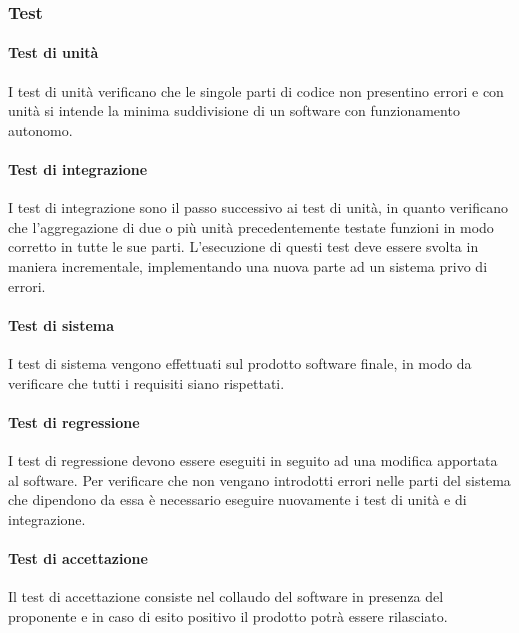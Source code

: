 \subsubsection{Test}
\paragraph{Test di unità} \Spazio
I test di unità verificano che le singole parti di codice non presentino errori e con unità si intende la minima suddivisione di un software con funzionamento autonomo.

\paragraph{Test di integrazione} \Spazio
I test di integrazione sono il passo successivo ai test di unità, in quanto verificano che l'aggregazione di due o più unità precedentemente testate funzioni in modo corretto in tutte le sue parti. L'esecuzione di questi test deve essere svolta in maniera incrementale, implementando una nuova parte ad un sistema privo di errori.

\paragraph{Test di sistema} \Spazio
I test di sistema vengono effettuati sul prodotto software finale, in modo da verificare che tutti i requisiti siano rispettati.

\paragraph{Test di regressione} \Spazio
I test di regressione devono essere eseguiti in seguito ad una modifica apportata al software. Per verificare che non vengano introdotti errori nelle parti del sistema che dipendono da essa è necessario eseguire nuovamente i test di unità e di integrazione.


\paragraph{Test di accettazione} \Spazio
Il test di accettazione consiste nel collaudo del software in presenza del proponente e in caso di esito positivo il prodotto potrà essere rilasciato.













\pagebreak